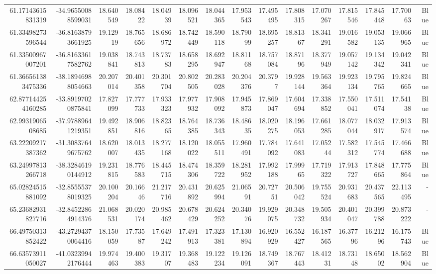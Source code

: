 \begin{center}
\begin{longtable}{rrrrrrrrrrrrrrr}
61.17143615831319 & -34.96550088599031 & 18.640549 & 18.08422 & 18.04939 & 18.096521 & 18.044365 & 17.953543 & 17.495495 & 17.808315 & 17.070267 & 17.815546 & 17.845448 & 17.70063 & Blue \\
61.33498273596544 & -36.81638793661925 & 19.12919 & 18.765656 & 18.686972 & 18.742449 & 18.590118 & 18.79099 & 18.695257 & 18.81367 & 18.341291 & 19.016582 & 19.053135 & 19.066965 & Blue \\
61.33500967007201 & -36.81633617582762 & 19.038841 & 18.743813 & 18.73783 & 18.658295 & 18.692947 & 18.81168 & 18.757084 & 18.87196 & 18.377949 & 19.057142 & 19.134342 & 19.042341 & Blue \\
61.366561383475336 & -38.18946988054663 & 20.207014 & 20.401358 & 20.301704 & 20.802505 & 20.283028 & 20.204376 & 20.3797 & 19.928144 & 19.563364 & 19.923134 & 19.795765 & 19.824665 & Blue \\
62.877144254160285 & -33.89197020875841 & 17.827099 & 17.777733 & 17.933323 & 17.977932 & 17.908092 & 17.945873 & 17.869047 & 17.604694 & 17.338852 & 17.550041 & 17.511074 & 17.54138 & Blue \\
62.9931906508685 & -37.97889641219351 & 19.492851 & 18.906816 & 18.82365 & 18.764385 & 18.736343 & 18.48635 & 18.020275 & 18.196053 & 17.661285 & 18.077044 & 18.032917 & 17.913574 & Blue \\
63.22209217387362 & -31.30837649675762 & 18.620007 & 18.013435 & 18.277168 & 18.120022 & 18.055511 & 17.960491 & 17.784092 & 17.641083 & 17.05244 & 17.582312 & 17.545774 & 17.466688 & Blue \\
63.24997813266718 & -38.32846190144912 & 19.231815 & 18.776583 & 18.445715 & 18.474306 & 18.359722 & 18.281952 & 17.992188 & 17.99965 & 17.719322 & 17.913727 & 17.848665 & 17.775864 & Blue \\
65.02824515881092 & -32.85555378019325 & 20.100204 & 20.16646 & 21.217716 & 20.431892 & 20.625994 & 21.06591 & 20.72751 & 20.506042 & 19.755524 & 20.931683 & 20.437565 & 22.113495 & - \\
65.23682931827716 & -32.84522864914376 & 21.068531 & 20.020174 & 20.985462 & 20.678429 & 20.624252 & 20.34076 & 19.929075 & 20.348732 & 19.505934 & 20.401047 & 20.399788 & 20.873222 & - \\
66.49750313852422 & -43.27294370064416 & 18.150059 & 17.73587 & 17.649242 & 17.491913 & 17.323381 & 17.130894 & 16.920929 & 16.552427 & 16.187565 & 16.37796 & 16.21296 & 16.175743 & Blue \\
66.63573911050027 & -41.03239942176444 & 19.974463 & 19.400383 & 19.31707 & 19.368483 & 19.122234 & 19.126091 & 18.749367 & 18.767443 & 18.41231 & 18.73148 & 18.65002 & 18.562904 & Blue \\

\end{longtable}
\end{center}
